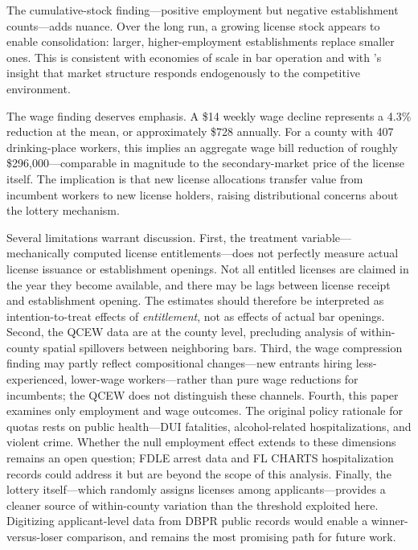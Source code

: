\documentclass[12pt]{article}
\begin{document}
The cumulative-stock finding---positive employment but negative establishment counts---adds nuance. Over the long run, a growing license stock appears to enable consolidation: larger, higher-employment establishments replace smaller ones. This is consistent with economies of scale in bar operation and with \citet{berry1992estimation}'s insight that market structure responds endogenously to the competitive environment.

The wage finding deserves emphasis. A \$14 weekly wage decline represents a 4.3\% reduction at the mean, or approximately \$728 annually. For a county with 407 drinking-place workers, this implies an aggregate wage bill reduction of roughly \$296,000---comparable in magnitude to the secondary-market price of the license itself. The implication is that new license allocations transfer value from incumbent workers to new license holders, raising distributional concerns about the lottery mechanism.

Several limitations warrant discussion. First, the treatment variable---mechanically computed license entitlements---does not perfectly measure actual license issuance or establishment openings. Not all entitled licenses are claimed in the year they become available, and there may be lags between license receipt and establishment opening. The estimates should therefore be interpreted as intention-to-treat effects of \textit{entitlement}, not as effects of actual bar openings. Second, the QCEW data are at the county level, precluding analysis of within-county spatial spillovers between neighboring bars. Third, the wage compression finding may partly reflect compositional changes---new entrants hiring less-experienced, lower-wage workers---rather than pure wage reductions for incumbents; the QCEW does not distinguish these channels. Fourth, this paper examines only employment and wage outcomes. The original policy rationale for quotas rests on public health---DUI fatalities, alcohol-related hospitalizations, and violent crime. Whether the null employment effect extends to these dimensions remains an open question; FDLE arrest data and FL CHARTS hospitalization records could address it but are beyond the scope of this analysis. Finally, the lottery itself---which randomly assigns licenses among applicants---provides a cleaner source of within-county variation than the threshold exploited here. Digitizing applicant-level data from DBPR public records would enable a winner-versus-loser comparison, and remains the most promising path for future work.
\end{document}
